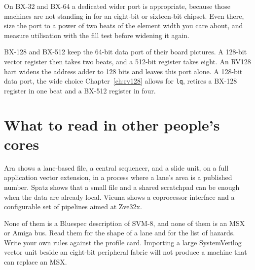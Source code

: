 On BX-32 and BX-64 a dedicated wider port is appropriate, because those machines are not standing in for an eight-bit or sixteen-bit chipset. Even there, size the port to a power of two beats of the element width you care about, and measure utilisation with the fill test before widening it again.

BX-128 and BX-512 keep the 64-bit data port of their board pictures. A 128-bit vector register then takes two beats, and a 512-bit register takes eight. An RV128 hart widens the address adder to 128 bits and leaves this port alone. A 128-bit data port, the wide choice Chapter~\ref{ch:rv128} allows for \texttt{lq}, retires a BX-128 register in one beat and a BX-512 register in four.

\section{What to read in other people's cores}

Ara shows a lane-based file, a central sequencer, and a slide unit, on a full application vector extension, in a process where a lane's area is a published number. Spatz shows that a small file and a shared scratchpad can be enough when the data are already local. Vicuna shows a coprocessor interface and a configurable set of pipelines aimed at Zve32x.

None of them is a Bluespec description of SVM-8, and none of them is an MSX or Amiga bus. Read them for the shape of a lane and for the list of hazards. Write your own rules against the profile card. Importing a large SystemVerilog vector unit beside an eight-bit peripheral fabric will not produce a machine that can replace an MSX.
